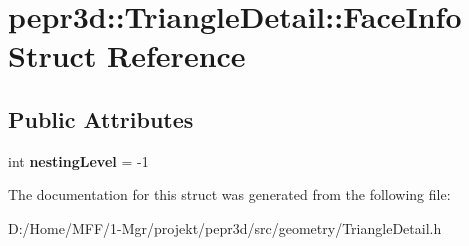 \hypertarget{structpepr3d_1_1_triangle_detail_1_1_face_info}{}\section{pepr3d\+::Triangle\+Detail\+::Face\+Info Struct Reference}
\label{structpepr3d_1_1_triangle_detail_1_1_face_info}
\subsection*{Public Attributes}
\begin{DoxyCompactItemize}
\item 
\mbox{\label{structpepr3d_1_1_triangle_detail_1_1_face_info_a55b54663e3bcbd9cc68b365672ae729c}} 
int {\bfseries nesting\+Level} = -\/1
\end{DoxyCompactItemize}


The documentation for this struct was generated from the following file\+:\begin{DoxyCompactItemize}
\item 
D\+:/\+Home/\+M\+F\+F/1-\/\+Mgr/projekt/pepr3d/src/geometry/Triangle\+Detail.\+h\end{DoxyCompactItemize}
